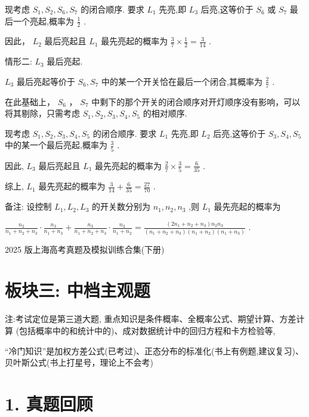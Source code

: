 \documentclass[10pt]{article}
\begin{document}
现考虑 \({S}_{1},{S}_{2},{S}_{6},{S}_{7}\) 的闭合顺序. 要求 \({L}_{1}\) 先亮,即 \({L}_{3}\) 后亮,这等价于 \({S}_{6}\) 或 \({S}_{7}\) 最后一个亮起,概率为 \(\frac{1}{2}\) .

因此， \({L}_{2}\) 最后亮起且 \({L}_{1}\) 最先亮起的概率为 \(\frac{3}{7} \times  \frac{1}{2} = \frac{3}{14}\) .

情形二: \({L}_{3}\) 最后亮起.

\({L}_{3}\) 最后亮起等价于 \({S}_{6},{S}_{7}\) 中的某一个开关恰在最后一个闭合,其概率为 \(\frac{2}{7}\) .

在此基础上， \({S}_{6}\) ， \({S}_{7}\) 中剩下的那个开关的闭合顺序对开灯顺序没有影响，可以将其剔除，只需考虑 \({S}_{1},{S}_{2},{S}_{3},{S}_{4},{S}_{5}\) 的相对顺序.

现考虑 \({S}_{1},{S}_{2},{S}_{3},{S}_{4},{S}_{5}\) 的闭合顺序. 要求 \({L}_{1}\) 先亮,即 \({L}_{2}\) 后亮,这等价于 \({S}_{3},{S}_{4},{S}_{5}\) 中的某一个最后亮起,概率为 \(\frac{3}{5}\) .

因此, \({L}_{3}\) 最后亮起且 \({L}_{1}\) 最先亮起的概率为 \(\frac{2}{7} \times  \frac{3}{5} = \frac{6}{35}\) .

综上, \({L}_{1}\) 最先亮起的概率为 \(\frac{3}{14} + \frac{6}{35} = \frac{27}{70}\) .

备注: 设控制 \({L}_{1},{L}_{2},{L}_{3}\) 的开关数分别为 \({n}_{1},{n}_{2},{n}_{3}\) ,则 \({L}_{1}\) 最先亮起的概率为

\(\frac{{n}_{2}}{{n}_{1} + {n}_{2} + {n}_{3}} \cdot  \frac{{n}_{3}}{{n}_{1} + {n}_{3}} + \frac{{n}_{3}}{{n}_{1} + {n}_{2} + {n}_{3}} \cdot  \frac{{n}_{2}}{{n}_{1} + {n}_{2}} = \frac{\left( {2{n}_{1} + {n}_{2} + {n}_{3}}\right) {n}_{2}{n}_{3}}{\left( {{n}_{1} + {n}_{2} + {n}_{3}}\right) \left( {{n}_{1} + {n}_{2}}\right) \left( {{n}_{1} + {n}_{3}}\right) }\) .

2025 版上海高考真题及模拟训练合集(下册)

\section*{板块三: 中档主观题}

注:考试定位是第三道大题, 重点知识是条件概率、全概率公式、期望计算、方差计算 (包括概率中的和统计中的)、成对数据统计中的回归方程和卡方检验等,

“冷门知识”是加权方差公式(已考过)、正态分布的标准化(书上有例题,建议复习)、贝叶斯公式(书上打星号，理论上不会考)

\section*{1. 真题回顾}
\end{document}

